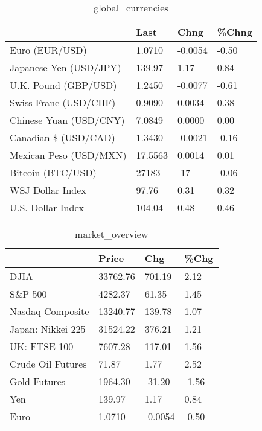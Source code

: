 \documentclass{article}%
\begin{document}
%


\begin{table}[htbp]%
\caption{global\_currencies}%
\centering%
\begin{adjustbox}{width=1\textwidth}%
\begin{tabular}{llll}
\toprule
                       &    Last &    Chng & \%Chng \\
\midrule
        Euro (EUR/USD) &  1.0710 & -0.0054 & -0.50 \\
Japanese Yen (USD/JPY) &  139.97 &    1.17 &  0.84 \\
  U.K. Pound (GBP/USD) &  1.2450 & -0.0077 & -0.61 \\
 Swiss Franc (USD/CHF) &  0.9090 &  0.0034 &  0.38 \\
Chinese Yuan (USD/CNY) &  7.0849 &  0.0000 &  0.00 \\
  Canadian \$ (USD/CAD) &  1.3430 & -0.0021 & -0.16 \\
Mexican Peso (USD/MXN) & 17.5563 &  0.0014 &  0.01 \\
     Bitcoin (BTC/USD) &   27183 &     -17 & -0.06 \\
      WSJ Dollar Index &   97.76 &    0.31 &  0.32 \\
     U.S. Dollar Index &  104.04 &    0.48 &  0.46 \\
\bottomrule
\end{tabular}
%
\end{adjustbox}%
\end{table}

%


\begin{table}[htbp]%
\caption{market\_overview}%
\centering%
\begin{adjustbox}{width=1\textwidth}%
\begin{tabular}{llll}
\toprule
                  &    Price &     Chg &  \%Chg \\
\midrule
             DJIA & 33762.76 &  701.19 &  2.12 \\
          S\&P 500 &  4282.37 &   61.35 &  1.45 \\
 Nasdaq Composite & 13240.77 &  139.78 &  1.07 \\
Japan: Nikkei 225 & 31524.22 &  376.21 &  1.21 \\
     UK: FTSE 100 &  7607.28 &  117.01 &  1.56 \\
Crude Oil Futures &    71.87 &    1.77 &  2.52 \\
     Gold Futures &  1964.30 &  -31.20 & -1.56 \\
              Yen &   139.97 &    1.17 &  0.84 \\
             Euro &   1.0710 & -0.0054 & -0.50 \\
\bottomrule
\end{tabular}
%
\end{adjustbox}%
\end{table}

%
\end{document}
